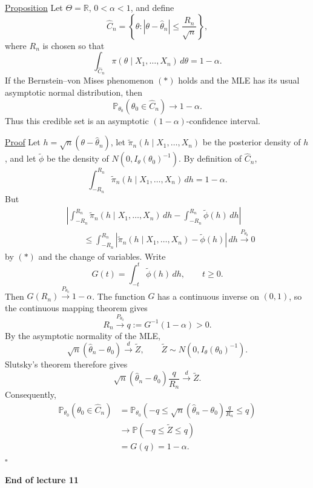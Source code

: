 \documentclass[11pt,a4paper]{article}
\begin{document}
\medskip
\noindent\underline{Proposition}\quad
Let $\Theta=\mathbb R$, $0<\alpha<1$, and define
\[
\hat C_n=\left\{\theta:|\theta-\hat\theta_n|\leq\frac{R_n}{\sqrt n}\right\},
\]
where $R_n$ is chosen so that
\[
\int_{\hat C_n}\pi(\theta\mid X_1,\ldots,X_n)\,d\theta=1-\alpha.
\]
If the Bernstein--von Mises phenomenon $(*)$ holds and the MLE has its usual
asymptotic normal distribution, then
\[
\mathbb P_{\theta_0}(\theta_0\in\hat C_n)\longrightarrow1-\alpha.
\]
Thus this credible set is an asymptotic $(1-\alpha)$-confidence interval.

\medskip
\noindent\underline{Proof}\quad
Let $h=\sqrt n(\theta-\hat\theta_n)$, let
$\widetilde\pi_n(h\mid X_1,\ldots,X_n)$ be the posterior density of $h$,
and let $\widetilde\phi$ be the density of
$N(0,I_\theta(\theta_0)^{-1})$.
By definition of $\hat C_n$,
\[
\int_{-R_n}^{R_n}\widetilde\pi_n(h\mid X_1,\ldots,X_n)\,dh=1-\alpha.
\]
But
\[
\begin{aligned}
&\left|\int_{-R_n}^{R_n}\widetilde\pi_n(h\mid X_1,\ldots,X_n)\,dh
-\int_{-R_n}^{R_n}\widetilde\phi(h)\,dh\right|\\
&\qquad\leq\int_{-R_n}^{R_n}
\left|\widetilde\pi_n(h\mid X_1,\ldots,X_n)-\widetilde\phi(h)\right|\,dh
\xrightarrow{P_{\theta_0}}0
\end{aligned}
\]
by $(*)$ and the change of variables.
Write
\[
G(t)=\int_{-t}^t\widetilde\phi(h)\,dh,\qquad t\geq0.
\]
Then $G(R_n)\xrightarrow{P_{\theta_0}}1-\alpha$.
The function $G$ has a continuous inverse on $(0,1)$, so the continuous
mapping theorem gives
\[
R_n\xrightarrow{P_{\theta_0}}q:=G^{-1}(1-\alpha)>0.
\]
By the asymptotic normality of the MLE,
\[
\sqrt n(\hat\theta_n-\theta_0)
\xrightarrow{d}\widetilde Z,
\qquad \widetilde Z\sim N(0,I_\theta(\theta_0)^{-1}).
\]
Slutsky's theorem therefore gives
\[
\sqrt n(\hat\theta_n-\theta_0)\frac{q}{R_n}
\xrightarrow{d}\widetilde Z.
\]
Consequently,
\[
\begin{aligned}
\mathbb P_{\theta_0}(\theta_0\in\hat C_n)
&=\mathbb P_{\theta_0}\left(
-q\leq\sqrt n(\hat\theta_n-\theta_0)\frac{q}{R_n}\leq q\right)\\
&\longrightarrow\mathbb P(-q\leq\widetilde Z\leq q)\\
&=G(q)=1-\alpha.
\end{aligned}
\]
\hfill$\square$

\begin{center}
\textbf{End of lecture 11}
\end{center}
\end{document}
